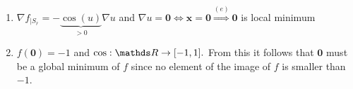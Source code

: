 \documentclass[a4paper]{article}
\begin{document}
{\begin{enumerate}
 Case $\mathbf{x} = \mathbf{0}: \left(\frac{\partial^2}{\partial \mathbf{x} \partial \mathbf{x}^\top}-\cos(u)\right)(\mathbf{0}) = \cos(u) \mathbf{0}  + 0 \frac{\partial}{\partial \mathbf{x}\partial \mathbf{x}^\top} u = \mathbf{0}$ (is p.s.d.)\\
Case $\mathbf{x} \in S_{\overline{r}} \setminus \{\mathbf{0}\}: u \in (0, \pi/2) \Rightarrow \sin(u) > 0, \cos(u) > 0$ \\
$\mathbf{v}^\top\left(\frac{\partial}{\partial \mathbf{x}} u\right)^\top \frac{\partial}{\partial \mathbf{x}} u\mathbf{v} = z\cdot z > 0$ with $z = \frac{\partial}{\partial \mathbf{x}}u\mathbf{v} \Rightarrow \left(\frac{\partial}{\partial \mathbf{x}} u\right)^\top \frac{\partial}{\partial \mathbf{x}} u$ is p.s.d.

$    \frac{\partial^2}{\partial \mathbf{x} \partial \mathbf{x}^\top}-\cos(u) = \underbrace{\cos(u) \left(\frac{\partial}{\partial \mathbf{x}} u\right)^\top \frac{\partial}{\partial \mathbf{x}} u}_{\text{p.s.d.}} + \underbrace{\sin(u) \frac{\partial}{\partial \mathbf{x}\partial \mathbf{x}^\top} u}_{\text{p.d.}}$ is p.d. \\
$\Rightarrow f_{|S_{\overline{r}}}$ is convex\\
\item $\nabla f_{|S_{\overline{r}}} = -\underbrace{\cos(u)}_{> 0}\nabla u$ and $\nabla u = \mathbf{0} \iff \mathbf{x} = \mathbf{0} \overset{(e)}{\Rightarrow} \mathbf{0}$ is local minimum
\item $f(\mathbf{0}) = -1$ and $\cos: \R \rightarrow [-1, 1].$ From this it follows that $\mathbf{0}$ must be a global minimum of $f$ since no element of the image of $f$ is smaller than $-1$.
\end{enumerate}
}
\end{document}
